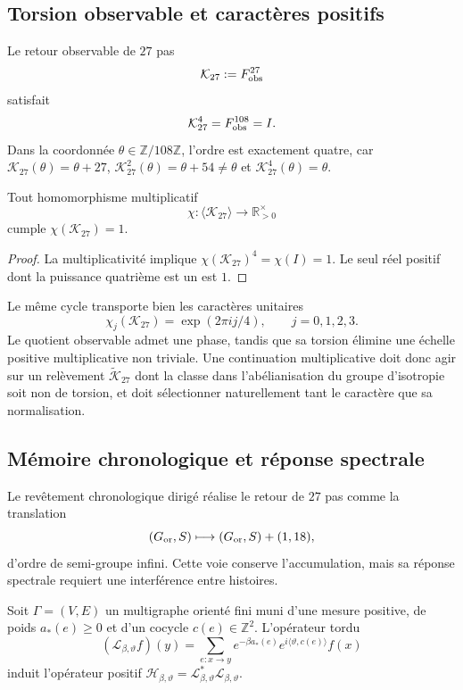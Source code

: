 \subsection{Torsion observable et caractères positifs}

Le retour observable de \(27\) pas
\[
 \mathcal K_{27}:=F_{\rm obs}^{27}
\]
satisfait
\[
 \mathcal K_{27}^{4}=F_{\rm obs}^{108}=I.
\]
Dans la coordonnée \(\theta\in\mathbb Z/108\mathbb Z\), l'ordre est
exactement quatre, car
\(\mathcal K_{27}(\theta)=\theta+27\),
\(\mathcal K_{27}^{2}(\theta)=\theta+54\neq\theta\) et
\(\mathcal K_{27}^{4}(\theta)=\theta\).

\begin{theorem}
\label{thm:caracter-positivo-G-rev11}
Tout homomorphisme multiplicatif
\[
 \chi:\langle\mathcal K_{27}\rangle
 \longrightarrow\mathbb R_{>0}^{\times}
\]
cumple \(\chi(\mathcal K_{27})=1\).
\end{theorem}

\begin{proof}
La multiplicativité implique
\(\chi(\mathcal K_{27})^4=\chi(I)=1\).
Le seul réel positif dont la puissance quatrième est un est \(1\).
\end{proof}

Le même cycle transporte bien les caractères unitaires
\[
 \chi_j(\mathcal K_{27})=\exp(2\pi ij/4),
 \qquad j=0,1,2,3.
\]
Le quotient observable admet une phase, tandis que sa torsion élimine une
échelle positive multiplicative non triviale. Une continuation multiplicative doit donc
agir sur un relèvement \(\widetilde{\mathcal K}_{27}\) dont la classe dans
l'abélianisation du groupe d'isotropie soit non de torsion, et doit sélectionner
naturellement tant le caractère que sa normalisation.

\subsection{Mémoire chronologique et réponse spectrale}
\label{sec:respuesta-espectral-G-rev11}

Le revêtement chronologique dirigé réalise le retour de \(27\) pas comme la
translation
\[
 (G_{\rm or},S)\longmapsto(G_{\rm or},S)+(1,18),
\]
d'ordre de semi-groupe infini. Cette voie conserve l'accumulation, mais sa
réponse spectrale requiert une interférence entre histoires.

Soit \(\Gamma=(V,E)\) un multigraphe orienté fini muni d'une mesure positive,
de poids \(a_\ast(e)\geq0\) et d'un cocycle \(c(e)\in\mathbb Z^2\). L'opérateur
tordu
\[
 (\mathcal L_{\beta,\vartheta}f)(y)
 =\sum_{e:x\to y}
 e^{-\beta a_\ast(e)}e^{i\langle\vartheta,c(e)\rangle}f(x)
\]
induit l'opérateur positif
\(\mathcal H_{\beta,\vartheta}
=\mathcal L_{\beta,\vartheta}^{*}\mathcal L_{\beta,\vartheta}\).

